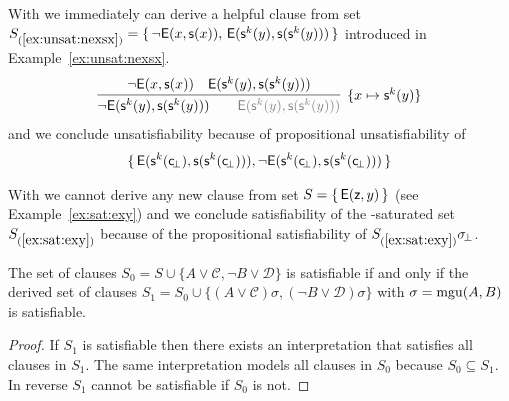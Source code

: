 \begin{example}
	With \InstGen{} we immediately can derive a helpful clause from set
\(
	S_{(\ref{ex:unsat:nexsx})} =
 \{ \,
{ \lnot\mathsf{E}(x, \mathsf{s}(x)) }, \,
{ \mathsf{E}(\mathsf{s}^k(y), \mathsf{s}(\mathsf{s}^k(y)))}
 \, \}
 \)
 introduced in Example~\ref{ex:unsat:nexsx}.
\begin{gather*}
\infer[ \{ x\mapsto\msucc^k(y)\}]{
	{ \lnot\mE(\msucc^k(y), \msucc(\msucc^k(y)))} \qquad
	{\colG \mE(\msucc^k(y), \msucc(\msucc^k(y)))}
}{
	{ \lnot\mE(x, \msucc(x)) } &
	{ \mE(\msucc^k(y), \msucc(\msucc^k(y)))}
}
\end{gather*}
and we conclude unsatisfiability because of propositional unsatisfiability of
\begin{gather*}
 \{ \,
	\mathsf{E}(\mathsf{s}^k(\mathsf{c} \!_\bot), \mathsf{s}(\mathsf{s}^k(\mathsf{c} \!_\bot))), \lnot\mathsf{E}(\mathsf{s}^k(\mathsf{c} \!_\bot), \mathsf{s}(\mathsf{s}^k(\mathsf{c} \!_\bot)))
 \, \}
\end{gather*}

\end{example}

\begin{example}
	With \InstGen{} we cannot derive any new clause from set
	\( S = \{ \, \mathsf{E}(\mathsf{z},y) \, \} \)
	(see Example~\ref{ex:sat:exy}) and we conclude satisfiability
	of the \InstGen-saturated set \( S_{(\ref{ex:sat:exy}) } \)
	because of the propositional satisfiability of
	\( S_{(\ref{ex:sat:exy})}\sigma \!_\bot \).
\end{example}

\begin{lemma}
	The set of clauses
	\(
		S_0 = S \cup
	 \{
		 A\lor\mathcal C, \lnot B\lor\mathcal D
	\}
	 \)
	is satisfiable if and only if
	the derived set of clauses
	\( S_1 = S_0 \cup \{ (A\lor\mathcal C)\sigma, (\lnot B\lor\mathcal D)\sigma \} \)
	with \( \sigma = \operatorname{mgu}(A,B) \) is satisfiable.
\end{lemma}

\begin{proof}
	If \( S_1 \) is satisfiable then there exists an interpretation that satisfies all clauses in \( S_1 \).
	The same interpretation models all clauses in \( S_0 \) because \( S_0\subseteq S_1 \).
	In reverse \( S_1 \) cannot be satisfiable if \( S_0 \) is not.


\end{proof}

